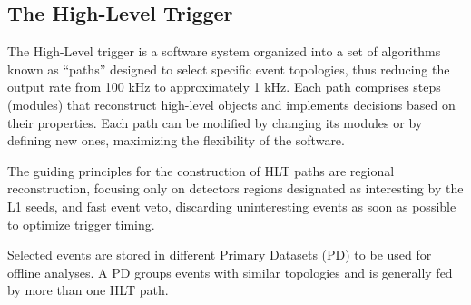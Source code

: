 \subsection{The High-Level Trigger}
\label{sec:hlt}

The High-Level trigger is a software system organized into a set of algorithms known as ``paths'' designed to select specific event topologies, thus reducing the output rate from 100 kHz to approximately 1 kHz. Each path comprises steps (modules) that reconstruct high-level objects and implements decisions based on their properties. Each path can be modified by changing its modules or by defining new ones, maximizing the flexibility of the software.

The guiding principles for the construction of HLT paths are regional reconstruction, focusing only on detectors regions designated as interesting by the L1 seeds, and fast event veto, discarding uninteresting events as soon as possible to optimize trigger timing.

Selected events are stored in different Primary Datasets (PD) to be used for offline analyses. A PD groups events with similar topologies and is generally fed by more than one HLT path.
